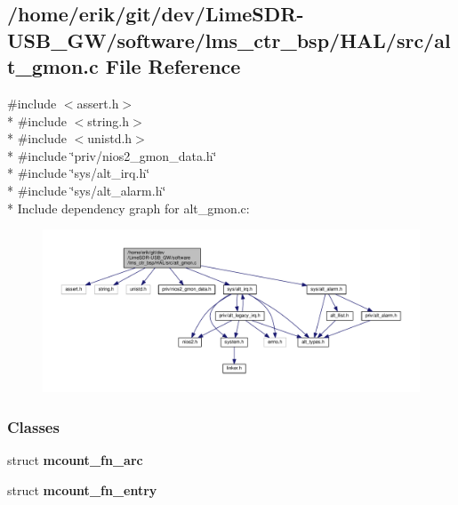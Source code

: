 \subsection{/home/erik/git/dev/\+Lime\+S\+D\+R-\/\+U\+S\+B\+\_\+\+G\+W/software/lms\+\_\+ctr\+\_\+bsp/\+H\+A\+L/src/alt\+\_\+gmon.c File Reference}
\label{alt__gmon_8c}
{\ttfamily \#include $<$assert.\+h$>$}\\*
{\ttfamily \#include $<$string.\+h$>$}\\*
{\ttfamily \#include $<$unistd.\+h$>$}\\*
{\ttfamily \#include \char`\"{}priv/nios2\+\_\+gmon\+\_\+data.\+h\char`\"{}}\\*
{\ttfamily \#include \char`\"{}sys/alt\+\_\+irq.\+h\char`\"{}}\\*
{\ttfamily \#include \char`\"{}sys/alt\+\_\+alarm.\+h\char`\"{}}\\*
Include dependency graph for alt\+\_\+gmon.\+c\+:
\nopagebreak
\begin{figure}[H]
\begin{center}
\leavevmode
\includegraphics[width=350pt]{d5/d53/alt__gmon_8c__incl}
\end{center}
\end{figure}
\subsubsection*{Classes}
\begin{DoxyCompactItemize}
\item 
struct {\bf mcount\+\_\+fn\+\_\+arc}
\item 
struct {\bf mcount\+\_\+fn\+\_\+entry}
\end{DoxyCompactItemize}
